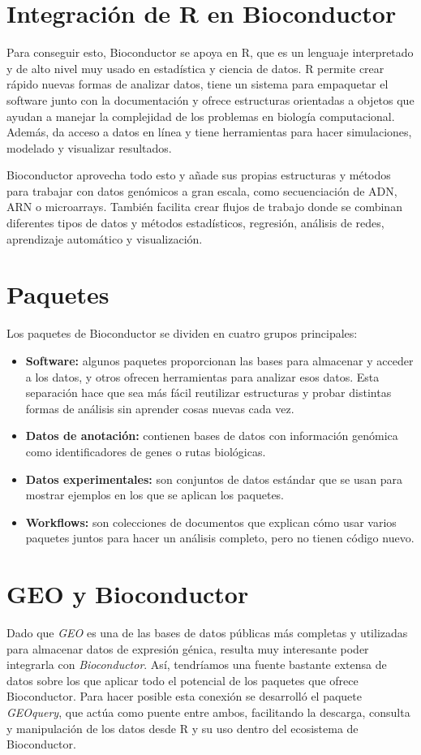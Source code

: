 \section{Integración de R en Bioconductor}
Para conseguir esto, Bioconductor se apoya en R, que es un lenguaje interpretado y de alto nivel muy usado en estadística y ciencia de datos. R permite 
crear rápido nuevas formas de analizar datos, tiene un sistema para empaquetar el software junto con la documentación y ofrece estructuras orientadas a 
objetos que ayudan a manejar la complejidad de los problemas en biología computacional. Además, da acceso a datos en línea y tiene herramientas para 
hacer simulaciones, modelado y visualizar resultados.

Bioconductor aprovecha todo esto y añade sus propias estructuras y métodos para trabajar con datos genómicos a gran escala, como secuenciación de ADN, 
ARN o microarrays. También facilita crear flujos de trabajo donde se combinan diferentes tipos de datos y métodos estadísticos, regresión, análisis de 
redes, aprendizaje automático y visualización.


\section{Paquetes}

Los paquetes de Bioconductor se dividen en cuatro grupos principales:

\begin{itemize}
\item \textbf{Software:} algunos paquetes proporcionan las bases para almacenar y acceder a los datos, y otros ofrecen herramientas para analizar esos 
datos. Esta separación hace que sea más fácil reutilizar estructuras y probar distintas formas de análisis sin aprender cosas nuevas cada vez.
\item \textbf{Datos de anotación:} contienen bases de datos con información genómica como identificadores de genes o rutas biológicas.
\item \textbf{Datos experimentales:} son conjuntos de datos estándar que se usan para mostrar ejemplos en los que se aplican los paquetes.
\item \textbf{Workflows:} son colecciones de documentos que explican cómo usar varios paquetes juntos para hacer un análisis completo, pero no tienen 
código nuevo.
\end{itemize}

\section{GEO y Bioconductor}

Dado que \textit{GEO} es una de las bases de datos públicas más completas y utilizadas para almacenar datos de expresión génica, resulta muy interesante
poder integrarla con \textit{Bioconductor}. Así, tendríamos una fuente bastante extensa de datos sobre los que aplicar todo el potencial de los paquetes 
que ofrece Bioconductor. Para hacer posible esta conexión se desarrolló el paquete \textit{GEOquery}, que actúa como puente entre ambos, facilitando la 
descarga, consulta y manipulación de los datos desde R y su uso dentro del ecosistema de Bioconductor.

